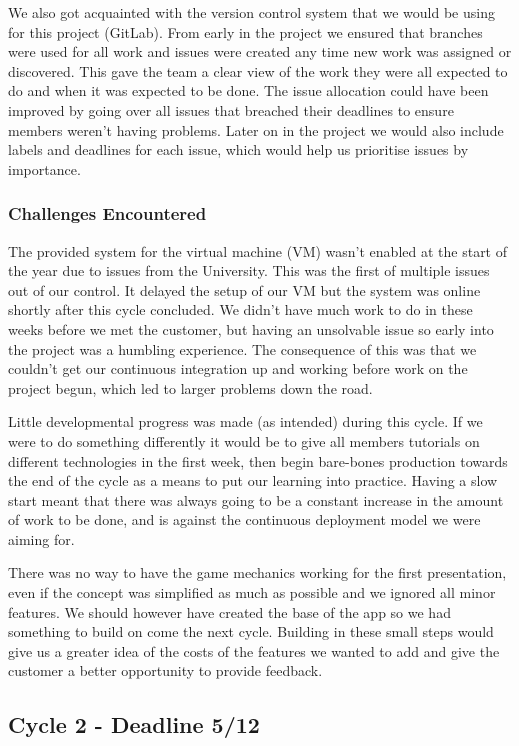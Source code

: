 \documentclass{l3proj}
\begin{document}
We also got acquainted with the version control system that we would be using for this project (GitLab). From early in the project we ensured that branches were used for all work and issues were created any time new work was assigned or discovered. This gave the team a clear view of the work they were all expected to do and when it was expected to be done. The issue allocation could have been improved by going over all issues that breached their deadlines to ensure members weren't having problems. Later on in the project we would also include labels and deadlines for each issue, which would help us prioritise issues by importance.

\subsubsection{Challenges Encountered}
The provided system for the virtual machine (VM) wasn't enabled at the start of the year due to issues from the University. This was the first of multiple issues out of our control. It delayed the setup of our VM but the system was online shortly after this cycle concluded. We didn't have much work to do in these weeks before we met the customer, but having an unsolvable issue so early into the project was a humbling experience. The consequence of this was that we couldn't get our continuous integration up and working before work on the project begun, which led to larger problems down the road. 

Little developmental progress was made (as intended) during this cycle. If we were to do something differently it would be to give all members tutorials on different technologies in the first week, then begin bare-bones production towards the end of the cycle as a means to put our learning into practice. Having a slow start meant that there was always going to be a constant increase in the amount of work to be done, and is against the continuous deployment model we were aiming for. 

There was no way to have the game mechanics working for the first presentation, even if the concept was simplified as much as possible and we ignored all minor features. We should however have created the base of the app so we had something to build on come the next cycle. Building in these small steps would give us a greater idea of the costs of the features we wanted to add and give the customer a better opportunity to provide feedback.

\subsection{Cycle 2 - Deadline 5/12}
\end{document}
